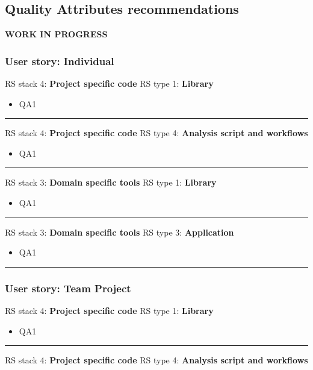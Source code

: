 \subsection{Quality Attributes recommendations}

\textbf{WORK IN PROGRESS}


\subsubsection{User story: Individual}

RS stack 4: \textbf{Project specific code} \tab RS type 1: \textbf{Library}

\begin{itemize}
    \item QA1
\end{itemize}
\hrule

RS stack 4: \textbf{Project specific code} \tab RS type 4: \textbf{Analysis script and workflows}

\begin{itemize}
    \item QA1
\end{itemize}
\hrule

RS stack 3: \textbf{Domain specific tools} \tab RS type 1: \textbf{Library}

\begin{itemize}
    \item QA1
\end{itemize}
\hrule

RS stack 3: \textbf{Domain specific tools} \tab RS type 3: \textbf{Application}

\begin{itemize}
    \item QA1
\end{itemize}
\hrule

\subsubsection{User story: Team Project}

RS stack 4: \textbf{Project specific code} \tab RS type 1: \textbf{Library}

\begin{itemize}
    \item QA1
\end{itemize}
\hrule

RS stack 4: \textbf{Project specific code} \tab RS type 4: \textbf{Analysis script and workflows}

